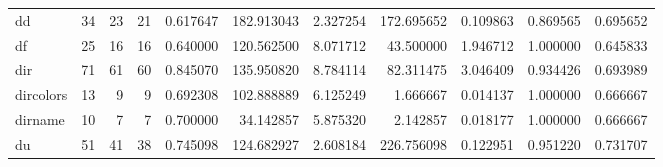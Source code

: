 \begin{longtable}{lrrrrrrrrrr}
dd        &                                      34 &                 23 &                                21 &                                   0.617647 &                             182.913043 &                                     2.327254 &                        172.695652 &                                0.109863 &                           0.869565 &                                           0.695652 \\
df        &                                      25 &                 16 &                                16 &                                   0.640000 &                             120.562500 &                                     8.071712 &                         43.500000 &                                1.946712 &                           1.000000 &                                           0.645833 \\
dir       &                                      71 &                 61 &                                60 &                                   0.845070 &                             135.950820 &                                     8.784114 &                         82.311475 &                                3.046409 &                           0.934426 &                                           0.693989 \\
dircolors &                                      13 &                  9 &                                 9 &                                   0.692308 &                             102.888889 &                                     6.125249 &                          1.666667 &                                0.014137 &                           1.000000 &                                           0.666667 \\
dirname   &                                      10 &                  7 &                                 7 &                                   0.700000 &                              34.142857 &                                     5.875320 &                          2.142857 &                                0.018177 &                           1.000000 &                                           0.666667 \\
du        &                                      51 &                 41 &                                38 &                                   0.745098 &                             124.682927 &                                     2.608184 &                        226.756098 &                                0.122951 &                           0.951220 &                                           0.731707 \\

\end{longtable}
